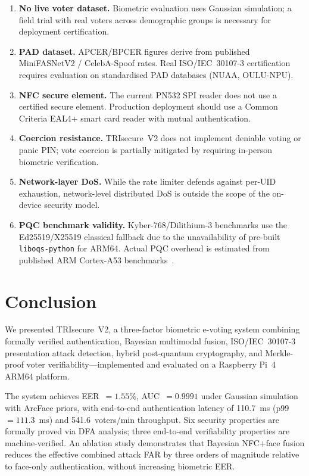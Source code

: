 \documentclass[preprint,12pt]{elsarticle}
\begin{document}
\begin{enumerate}
  \item \textbf{No live voter dataset.} Biometric evaluation uses Gaussian
    simulation; a field trial with real voters across demographic groups is
    necessary for deployment certification.
  \item \textbf{PAD dataset.} APCER/BPCER figures derive from published
    MiniFASNetV2 / CelebA-Spoof rates. Real ISO/IEC~30107-3 certification
    requires evaluation on standardised PAD databases (NUAA, OULU-NPU).
  \item \textbf{NFC secure element.} The current PN532 SPI reader does not
    use a certified secure element. Production deployment should use a
    Common Criteria EAL4+ smart card reader with mutual authentication.
  \item \textbf{Coercion resistance.} TRIsecure~V2 does not implement
    deniable voting or panic PIN; vote coercion is partially mitigated
    by requiring in-person biometric verification.
  \item \textbf{Network-layer DoS.} While the rate limiter defends against
    per-UID exhaustion, network-level distributed DoS is outside the
    scope of the on-device security model.
  \item \textbf{PQC benchmark validity.} Kyber-768/Dilithium-3 benchmarks
    use the Ed25519/X25519 classical fallback due to the unavailability of
    pre-built \texttt{liboqs-python} for ARM64. Actual PQC overhead is
    estimated from published ARM Cortex-A53 benchmarks~\cite{sikeridis2020pqc}.
\end{enumerate}

\section{Conclusion}
\label{sec:conclusion}

We presented TRIsecure~V2, a three-factor biometric e-voting system
combining formally verified authentication, Bayesian multimodal fusion,
ISO/IEC~30107-3 presentation attack detection, hybrid post-quantum
cryptography, and Merkle-proof voter verifiability—implemented and
evaluated on a Raspberry Pi~4 ARM64 platform.

The system achieves EER~$=1.55\%$, AUC~$=0.9991$ under Gaussian
simulation with ArcFace priors, with end-to-end authentication latency of
110.7~ms (p99~$=111.3$~ms) and 541.6~voters/min throughput. Six security
properties are formally proved via DFA analysis; three end-to-end
verifiability properties are machine-verified. An ablation study
demonstrates that Bayesian NFC$+$face fusion reduces the effective combined
attack FAR by three orders of magnitude relative to face-only authentication,
without increasing biometric EER.
\end{document}

